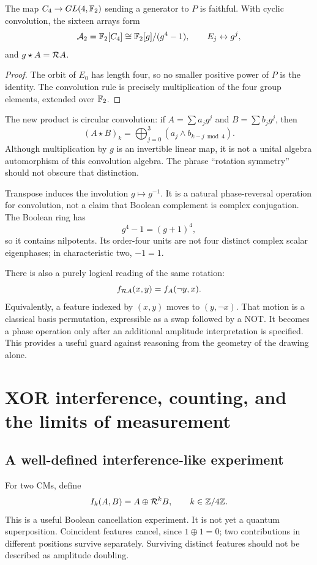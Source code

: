 \begin{proposition}
The map $C_4\to GL(4,\mathbb F_2)$ sending a generator to $P$ is faithful. With cyclic convolution, the sixteen arrays form
\begin{equation}
 \mathcal A_2=\mathbb F_2[C_4]\cong\mathbb F_2[g]/(g^4-1),\qquad E_j\leftrightarrow g^j,
\end{equation}
and $g\star A=\mathcal R A$.
\end{proposition}
\begin{proof}
The orbit of $E_0$ has length four, so no smaller positive power of $P$ is the identity. The convolution rule is precisely multiplication of the four group elements, extended over $\mathbb F_2$.
\end{proof}
The new product is circular convolution: if $A=\sum a_jg^j$ and $B=\sum b_jg^j$, then
\begin{equation}
 (A\star B)_k=\bigoplus_{j=0}^3(a_j\land b_{k-j\bmod4}).
\end{equation}
Although multiplication by $g$ is an invertible linear map, it is not a unital algebra automorphism of this convolution algebra. The phrase ``rotation symmetry'' should not obscure that distinction.

Transpose induces the involution $g\mapsto g^{-1}$. It is a natural phase-reversal operation for convolution, not a claim that Boolean complement is complex conjugation. The Boolean ring has
\begin{equation}\label{eq:nilpotent}
 g^4-1=(g+1)^4,
\end{equation}
so it contains nilpotents. Its order-four units are not four distinct complex scalar eigenphases; in characteristic two, $-1=1$.

There is also a purely logical reading of the same rotation:
\begin{equation}
 f_{\mathcal R A}(x,y)=f_A(\neg y,x).
\end{equation}
Equivalently, a feature indexed by $(x,y)$ moves to $(y,\neg x)$. That motion is a classical basis permutation, expressible as a swap followed by a NOT. It becomes a phase operation only after an additional amplitude interpretation is specified. This provides a useful guard against reasoning from the geometry of the drawing alone.

\section{XOR interference, counting, and the limits of measurement}\label{sec:boolean}
\subsection{A well-defined interference-like experiment}
For two CMs, define
\begin{equation}
 I_k(A,B)=A\oplus\mathcal R^kB,\qquad k\in\mathbb Z/4\mathbb Z.
\end{equation}
This is a useful Boolean cancellation experiment. It is not yet a quantum superposition. Coincident features cancel, since $1\oplus1=0$; two contributions in different positions survive separately. Surviving distinct features should not be described as amplitude doubling.

